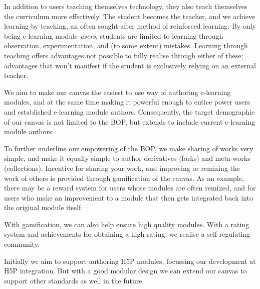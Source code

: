 In addition to users teaching themselves technology, they also teach 
themselves the curriculum more effectively. The student becomes the teacher, 
and we achieve learning by teaching, an often sought-after method of 
reinforced learning. By only being e-learning module \emph{users}, students 
are limited to learning through observation, experimentation, and (to some 
extent) mistakes. Learning through teaching offers advantages not possible to 
fully realise through either of these; advantages that won't manifest if the 
student is exclusively relying on an external 
teacher\cite{cortese2005learning}.

We aim to make our canvas the easiest to use way of authoring e-learning 
modules, and at the same time making it powerful enough to entice power users 
and established e-learning module authors. Consequently, the target 
demographic of our canvas is not limited to the BOP, but extends to include 
current e-learning module authors.

To further underline our empowering of the BOP, we make sharing of works very 
simple, and make it equally simple to author derivatives (forks) and 
meta-works (collections). Incentive for sharing your work, and improving or 
remixing the work of others is provided through gamification of the canvas. As 
an example, there may be a reward system for users whose modules are often 
remixed, and for users who make an improvement to a module that then gets 
integrated back into the original module itself.

With gamification, we can also help ensure high quality modules. With a rating 
system and achievements for obtaining a high rating, we realise a 
self-regulating community.

Initially we aim to support authoring H5P modules, focussing our development 
at H5P integration. But with a good modular design we can extend our canvas to 
support other standards as well in the future.
